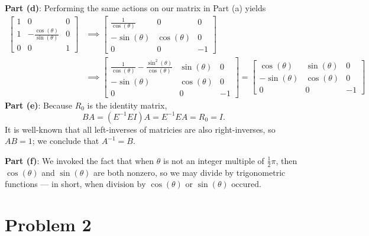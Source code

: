 \documentclass[11pt]{article}
\begin{document}
\textbf{Part (d)}: Performing the same actions on our matrix in Part (a) yields
\begin{align*}
	\begin{bmatrix} 1 & 0 & 0 \\ 1 & -\frac{\cos(\theta)}{\sin(\theta)} & 0 \\ 0 & 0 & 1 \end{bmatrix} &\implies \begin{bmatrix} \frac{1}{\cos(\theta)} & 0 & 0 \\ -\sin(\theta) & \cos(\theta) & 0 \\ 0 & 0 & -1 \end{bmatrix} \\
	&\implies \begin{bmatrix} \frac{1}{\cos(\theta)} - \frac{\sin^{2}(\theta)}{\cos(\theta)} & \sin(\theta) & 0 \\ -\sin(\theta) & \cos(\theta) & 0 \\ 0 & 0 & -1 \end{bmatrix} = \begin{bmatrix} \cos(\theta) & \sin(\theta) & 0 \\ -\sin(\theta) & \cos(\theta) & 0 \\ 0 & 0 & -1 \end{bmatrix}
\end{align*}
\textbf{Part (e)}: Because $R_{0}$ is the identity matrix,
\[
	BA = (E^{-1}EI)A = E^{-1}EA = R_{0} = I.
\]
It is well-known that all left-inverses of matricies are also right-inverses, so $AB = 1$; we conclude that $\boxed{A^{-1} = B}$.

\textbf{Part (f)}: We invoked the fact that when $\theta$ is not an integer multiple of $\tfrac{1}{2} \pi$, then $\cos(\theta)$ and $\sin(\theta)$ are both nonzero, so we may divide by trigonometric functions --- in short, when $\boxed{\text{division by $\cos(\theta)$ or $\sin(\theta)$ occured}}$.


\section{Problem 2}
\end{document}
